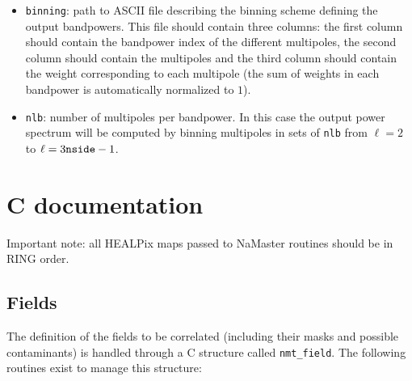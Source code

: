 \documentclass[a4paper,10pt]{article}
\begin{document}
\begin{itemize}
 \item {\tt binning}: path to ASCII file describing the binning scheme defining the output bandpowers. This file should contain three columns: the first column should contain the bandpower index of the different multipoles, the second column should contain the multipoles and the third column should contain the weight corresponding to each multipole (the sum of weights in each bandpower is automatically normalized to $1$).
 \item {\tt nlb}: number of multipoles per bandpower. In this case the output power spectrum will be computed by binning multipoles in sets of {\tt nlb} from $\ell=2$ to $\ell=3{\tt nside}-1$.
\end{itemize}






\section{C documentation}
Important note: all HEALPix maps passed to NaMaster routines should be in RING order.

\subsection{Fields}
The definition of the fields to be correlated (including their masks and possible contaminants) is handled through a C structure called {\tt nmt\_field}. The following routines exist to manage this structure:
\end{document}
